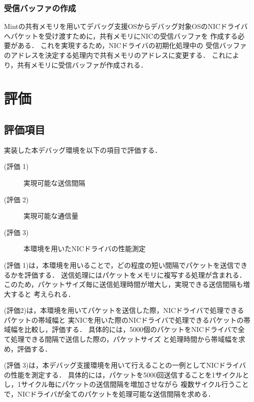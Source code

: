 \documentclass[submit,techreq,noauthor,dvipdfmx]{ipsj}
\begin{document}
\subsubsection*{受信バッファの作成}\label{sec:creating_recieving_buffer}

Mintの共有メモリを用いてデバッグ支援OSからデバッグ対象OSのNICドライバ
へパケットを受け渡すために，共有メモリにNICの受信バッファを
作成する必要がある．
これを実現するため，NICドライバの初期化処理中の
受信バッファのアドレスを決定する処理内で共有メモリのアドレスに変更する．
これにより，共有メモリに受信バッファが作成される．

\section{評価}\label{chap:evaluation}

\subsection{評価項目}\label{sec:item-of-evaluation}

実装した本デバッグ環境を以下の項目で評価する．
\begin{description}
    \item[(評価 1)]実現可能な送信間隔
    \item[(評価 2)]実現可能な通信量
    \item[(評価 3)]本環境を用いたNICドライバの性能測定
\end{description}

(評価 1)は，本環境を用いることで，どの程度の短い間隔でパケットを送信できるかを評価する．
送信処理にはパケットをメモリに複写する処理が含まれる．
このため，パケットサイズ毎に送信処理時間が増大し，実現できる送信間隔も増大すると
考えられる．

(評価2)は，本環境を用いてパケットを送信した際，NICドライバで処理できるパケットの帯域幅と
実NICを用いた際のNICドライバで処理できるパケットの帯域幅を比較し，評価する．
具体的には，5000個のパケットをNICドライバで全て処理できる間隔で送信した際の，パケットサイズ
と処理時間から帯域幅を求め，評価する．

(評価 3)は，本デバッグ支援環境を用いて行えることの一例としてNICドライバの性能を測定する．
具体的には，パケットを5000回送信することを1サイクルとし，1サイクル毎にパケットの送信間隔を増加させながら
複数サイクル行うことで，NICドライバが全てのパケットを処理可能な送信間隔を求める．
\end{document}
